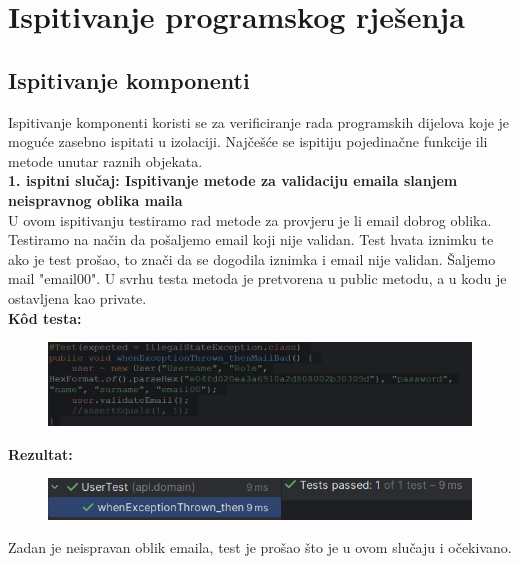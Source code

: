 \eject 


\section{Ispitivanje programskog rješenja}


\subsection{Ispitivanje komponenti}
\textnormal{Ispitivanje komponenti koristi se za verificiranje rada programskih dijelova koje je moguće zasebno ispitati u izolaciji. Najčešće se ispitiju pojedinačne funkcije ili metode unutar raznih objekata.}\\

\noindent \textbf{1. ispitni slučaj: Ispitivanje metode za validaciju emaila slanjem neispravnog oblika maila}\\
U ovom ispitivanju testiramo rad metode za provjeru je li email dobrog oblika. Testiramo na način da pošaljemo email koji nije validan. Test hvata iznimku te ako je test prošao, to znači da se dogodila iznimka i email nije validan. Šaljemo mail "email00". U svrhu testa metoda je pretvorena u public metodu, a u kodu je ostavljena kao private. \\
\textbf{Kôd testa:}
\begin{figure}[H]
	\includegraphics[scale=0.5]{slike/kodTesta1.PNG} %
	\centering
\end{figure}
\noindent \textbf{Rezultat:}
\begin{figure}[H]
	\includegraphics[scale=0.7]{slike/test1.PNG} %
	\centering
\end{figure}
\noindent Zadan je neispravan oblik emaila, test je prošao što je u ovom slučaju i očekivano. \\

